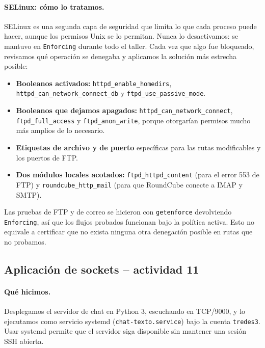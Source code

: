 \documentclass[11pt,a4paper]{article}
\begin{document}
\paragraph{SELinux: cómo lo tratamos.} SELinux es una segunda capa de seguridad que limita lo que cada proceso puede hacer, aunque los permisos Unix se lo permitan. Nunca lo desactivamos: se mantuvo en \texttt{Enforcing} durante todo el taller. Cada vez que algo fue bloqueado, revisamos qué operación se denegaba y aplicamos la solución más estrecha posible:
\begin{itemize}\setlength\itemsep{0pt}
\item \textbf{Booleanos activados:} \texttt{httpd\_enable\_homedirs}, \texttt{httpd\_can\_network\_connect\_db} y \texttt{ftpd\_use\_passive\_mode}.
\item \textbf{Booleanos que dejamos apagados:} \texttt{httpd\_can\_network\_connect}, \texttt{ftpd\_full\_access} y \texttt{ftpd\_anon\_write}, porque otorgarían permisos mucho más amplios de lo necesario.
\item \textbf{Etiquetas de archivo y de puerto} específicas para las rutas modificables y los puertos de FTP.
\item \textbf{Dos módulos locales acotados:} \texttt{ftpd\_httpd\_content} (para el error 553 de FTP) y \texttt{roundcube\_http\_mail} (para que RoundCube conecte a IMAP y SMTP).
\end{itemize}
Las pruebas de FTP y de correo se hicieron con \texttt{getenforce} devolviendo \texttt{Enforcing}, así que los flujos probados funcionan bajo la política activa. Esto no equivale a certificar que no exista ninguna otra denegación posible en rutas que no probamos.

\subsection{Aplicación de sockets -- actividad 11}
\paragraph{Qué hicimos.} Desplegamos el servidor de chat en Python 3, escuchando en TCP/9000, y lo ejecutamos como servicio systemd (\texttt{chat-texto.service}) bajo la cuenta \texttt{tredes3}. Usar systemd permite que el servidor siga disponible sin mantener una sesión SSH abierta.
\end{document}
